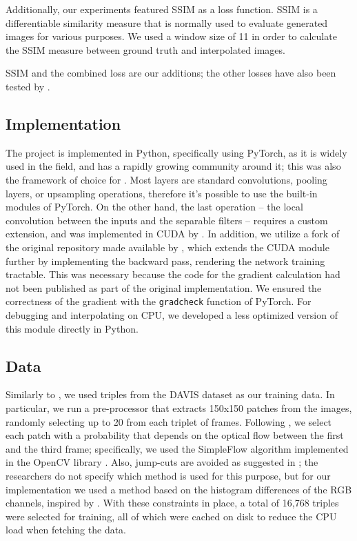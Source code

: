 \documentclass[10pt,twocolumn,letterpaper]{article}
\begin{document}
Additionally, our experiments featured SSIM as a loss function. SSIM is a differentiable similarity measure that is normally used to evaluate generated images for various purposes. We used a window size of 11 in order to calculate the SSIM measure between ground truth and interpolated images.

SSIM and the combined loss are our additions; the other losses have also been tested by \citeauthor{SepConv}.


\subsection{Implementation}
The project is implemented in Python, specifically using PyTorch, as it is widely used in the field, and has a rapidly growing community around it; this was also the framework of choice for \citeauthor{SepConv}. Most layers are standard convolutions, pooling layers, or upsampling operations, therefore it's possible to use the built-in modules of PyTorch. On the other hand, the last operation -- the local convolution between the inputs and the separable filters -- requires a custom extension, and was implemented in CUDA by \citeauthor{SepConv}. In addition, we utilize a fork of the original repository made available by \citeauthor{GibbonsFork}, which extends the CUDA module further by implementing the backward pass, rendering the network training tractable. This was necessary because the code for the gradient calculation had not been published as part of the original implementation. We ensured the correctness of the gradient with the \texttt{gradcheck} function of PyTorch. For debugging and interpolating on CPU, we developed a less optimized version of this module directly in Python.


\subsection{Data}
\label{sec:data}
Similarly to \citeauthor{PhaseNet}, we used triples from the DAVIS dataset \cite{Davis16, Davis17} as our training data. In particular, we run a pre-processor that extracts 150x150 patches from the images, randomly selecting up to 20 from each triplet of frames. Following \cite{SepConv}, we select each patch with a probability that depends on the optical flow between the first and the third frame; specifically, we used the SimpleFlow algorithm implemented in the OpenCV library \cite{OpenCV}. Also, jump-cuts are avoided as suggested in \cite{SepConv}; the researchers do not specify which method is used for this purpose, but for our implementation we used a method based on the histogram differences of the RGB channels, inspired by \citeauthor{Priya10}. With these constraints in place, a total of 16,768 triples were selected for training, all of which were cached on disk to reduce the CPU load when fetching the data.
\end{document}
